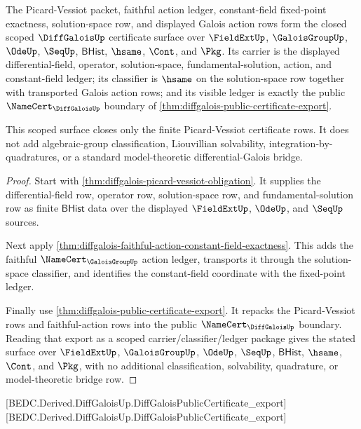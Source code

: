 \begin{theorem}
\label{thm:diffgalois-scoped-certificate-surface}
The Picard-Vessiot packet, faithful action ledger, constant-field fixed-point
exactness, solution-space row, and displayed Galois action rows form the closed
scoped $\DiffGaloisUp$ certificate surface over $\FieldExtUp$,
$\GaloisGroupUp$, $\OdeUp$, $\SeqUp$, $\mathsf{BHist}$, $\hsame$, $\Cont$, and
$\Pkg$. Its carrier is the displayed differential-field, operator,
solution-space, fundamental-solution, action, and constant-field ledger; its
classifier is $\hsame$ on the solution-space row together with transported
Galois action rows; and its visible ledger is exactly the public
$\NameCert_{\DiffGaloisUp}$ boundary of
\autoref{thm:diffgalois-public-certificate-export}.

This scoped surface closes only the finite Picard-Vessiot certificate rows. It
does not add algebraic-group classification, Liouvillian solvability,
integration-by-quadratures, or a standard model-theoretic differential-Galois
bridge.
\end{theorem}
\begin{proof}
Start with \autoref{thm:diffgalois-picard-vessiot-obligation}. It supplies the
differential-field row, operator row, solution-space row, and
fundamental-solution row as finite $\mathsf{BHist}$ data over the displayed
$\FieldExtUp$, $\OdeUp$, and $\SeqUp$ sources.

Next apply
\autoref{thm:diffgalois-faithful-action-constant-field-exactness}. This adds
the faithful $\NameCert_{\GaloisGroupUp}$ action ledger, transports it through
the solution-space classifier, and identifies the constant-field coordinate
with the fixed-point ledger.

Finally use \autoref{thm:diffgalois-public-certificate-export}. It repacks the
Picard-Vessiot rows and faithful-action rows into the public
$\NameCert_{\DiffGaloisUp}$ boundary. Reading that export as a scoped
carrier/classifier/ledger package gives the stated surface over
$\FieldExtUp$, $\GaloisGroupUp$, $\OdeUp$, $\SeqUp$, $\mathsf{BHist}$,
$\hsame$, $\Cont$, and $\Pkg$, with no additional classification, solvability,
quadrature, or model-theoretic bridge row.
\end{proof}

[BEDC.Derived.DiffGaloisUp.DiffGaloisPublicCertificate\_export]
[BEDC.Derived.DiffGaloisUp.DiffGaloisPublicCertificate\_export]


